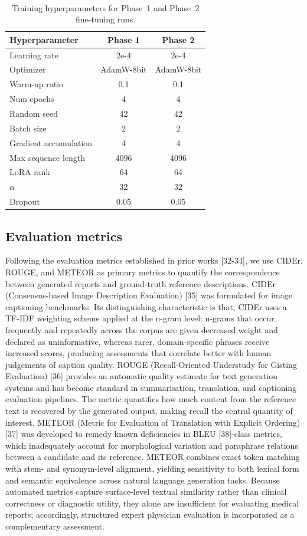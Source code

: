 ﻿﻿\documentclass[12pt]{report}
\begin{document}
\begin{table}[H]
\centering
\caption{Training hyperparameters for Phase~1 and Phase~2 fine-tuning runs.}
\label{tab:hyperparams}
\begin{tabular}{lcc}
\toprule
Hyperparameter & Phase 1 & Phase 2 \\
\midrule
Learning rate & 2e-4 & 2e-4 \\
Optimizer & AdamW-8bit & AdamW-8bit \\
Warm-up ratio & 0.1 & 0.1 \\
Num epochs & 4 & 4 \\
Random seed & 42 & 42 \\
\midrule
Batch size & 2 & 2 \\
Gradient accumulation & 4 & 4 \\
Max sequence length & 4096 & 4096 \\
\midrule
LoRA rank & 64 & 64 \\
$\alpha$ & 32 & 32 \\
Dropout & 0.05 & 0.05 \\
\bottomrule
\end{tabular}
\end{table}

\subsection{Evaluation metrics}
Following the evaluation metrics established in prior works [32-34], we use CIDEr, ROUGE, and METEOR as primary metrics to quantify the correspondence between generated reports and ground-truth reference descriptions. CIDEr (Consensus-based Image Description Evaluation) [35] was formulated for image captioning benchmarks. Its distinguishing characteristic is that, CIDEr uses a TF-IDF weighting scheme applied at the n-gram level: n-grams that occur frequently and repeatedly across the corpus are given decreased weight and declared as uninformative, whereas rarer, domain-specific phrases receive increased scores, producing assessments that correlate better with human judgements of caption quality.
ROUGE (Recall-Oriented Understudy for Gisting Evaluation) [36] provides an automatic quality estimate for text generation systems and has become standard in summarisation, translation, and captioning evaluation pipelines. The metric quantifies how much content from the reference text is recovered by the generated output, making recall the central quantity of interest.
METEOR (Metric for Evaluation of Translation with Explicit Ordering) [37] was developed to remedy known deficiencies in BLEU [38]-class metrics, which inadequately account for morphological variation and paraphrase relations between a candidate and its reference. METEOR combines exact token matching with stem- and synonym-level alignment, yielding sensitivity to both lexical form and semantic equivalence across natural language generation tasks.
Because automated metrics capture surface-level textual similarity rather than clinical correctness or diagnostic utility, they alone are insufficient for evaluating medical reports; accordingly, structured expert physician evaluation is incorporated as a complementary assessment.
\end{document}
